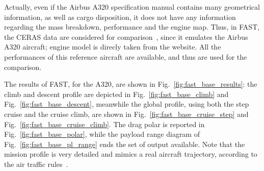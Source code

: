 Actually, even if the Airbus A320 specification manual contains many geometrical information, as well as cargo disposition, it does not have any information regarding the mass breakdown, performance and the engine map. 
Thus, in FAST, the CERAS data are considered for comparison~\cite{bib:ceras}, since it emulates the Airbus A320 aircraft; engine model is direcly taken from the website. 
All the performances of this reference aircraft are available, and thus are used for the comparison. 

The results of FAST, for the A320, are shown in Fig.~\ref{fig:fast_base_results}: the climb and descent profile are depicted in Fig.~\ref{fig:fast_base_climb} and Fig.~\ref{fig:fast_base_descent}, meanwhile the global profile, using both the step cruise and the cruise climb, are shown in Fig.~\ref{fig:fast_base_cruise_step} and Fig.~\ref{fig:fast_base_cruise_climb}. 
The drag polar is reported in Fig.~\ref{fig:fast_base_polar}, while the payload range diagram of Fig.~\ref{fig:fast_base_pl_range} ends the set of output available. 
Note that the mission profile is very detailed and mimics a real aircraft trajectory, according to the air traffic rules~\cite{bib:mission_path_def}.
